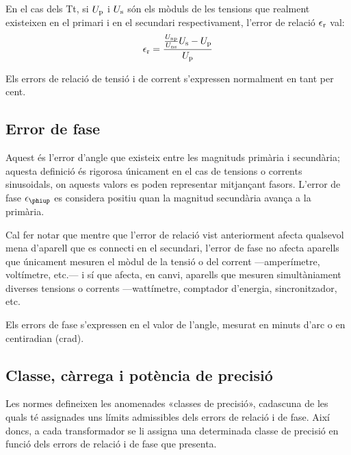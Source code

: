 En el cas dels Tt, si $U_\mathrm{p}$ i $U_\mathrm{s}$ són els mòduls de les tensions que
realment existeixen en el primari i en el secundari respectivament,
l'error de relació $\epsilon_\mathrm{r}$ val:
\begin{equation}
    \epsilon_\mathrm{r} = \frac{\frac{U_\mathrm{np}}{U_\mathrm{ns}} U_\mathrm{s} - U_\mathrm{p}} {U_\mathrm{p}}
\end{equation}

Els errors de relació de tensió i de corrent s'expressen
normalment en tant per cent.

\subsection{Error de fase}

Aquest és l'error d'angle  que existeix entre les magnituds primària i
secundària; aquesta definició és rigorosa únicament en el cas de
tensions o corrents sinusoidals, on aquests valors es poden
representar mitjançant fasors. L'error de fase $\epsilon\ped{\phiup}$ es considera positiu quan la magnitud secundària avança a la primària.
\index{$\epsilon\ped{\phiup}$}

 Cal fer notar que mentre que l'error de relació
vist anteriorment afecta qualsevol mena d'aparell que es
connecti en el secundari, l'error de fase no afecta aparells que
únicament mesuren el mòdul de la tensió o del corrent ---amperímetre,
voltímetre, etc.--- i sí que afecta, en canvi, aparells que mesuren
simultàniament diverses tensions o corrents ---wattímetre, comptador
d'energia, sincronitzador, etc.

Els errors de fase s'expressen en el valor de l'angle, mesurat en
minuts d'arc o en centiradian (crad).

\subsection{Classe, càrrega i potència de precisió}

Les normes defineixen les anomenades «classes de precisió»,
cadascuna de les quals té assignades uns límits admissibles dels
errors de relació i de fase. Així doncs, a cada transformador
se li assigna una determinada classe de precisió en funció dels errors
de relació i de fase que presenta.

